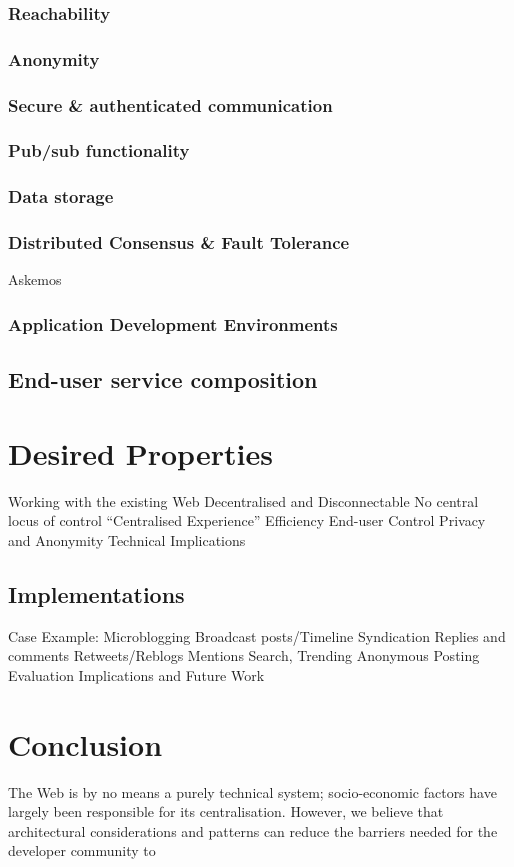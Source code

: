 \documentclass{acm_proc_article-sp}
\begin{document}
{\subsubsection{Reachability}
\subsubsection{Anonymity}
\subsubsection{Secure \& authenticated communication}
\subsubsection{Pub/sub functionality}
\subsubsection{Data storage}
\subsubsection{Distributed Consensus \& Fault Tolerance}
	Askemos
\subsubsection{Application Development Environments}
\subsection{End-user service composition}

\section{Desired Properties}

Working with the existing Web 
Decentralised and Disconnectable
	No central locus of control
“Centralised Experience”
Efficiency
End-user Control
Privacy and Anonymity
Technical Implications

\subsection{Implementations}
Case Example: Microblogging
	Broadcast posts/Timeline Syndication
	Replies and comments
Retweets/Reblogs
Mentions
Search, Trending	
Anonymous Posting
Evaluation
Implications and Future Work


\section{Conclusion}
The Web is by no means a purely technical system; socio-economic factors have largely been responsible for its centralisation.  However, we believe that architectural considerations and patterns can reduce the barriers needed for the developer community to

}
\end{document}
